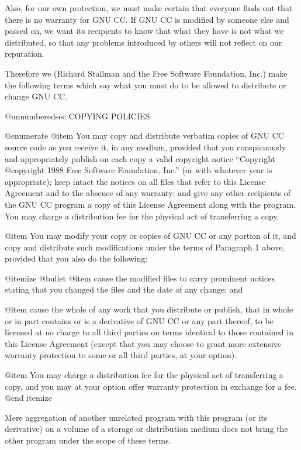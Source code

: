   Also, for our own protection, we must make certain that everyone
finds out that there is no warranty for GNU CC.  If GNU CC is modified by
someone else and passed on, we want its recipients to know that what
they have is not what we distributed, so that any problems introduced
by others will not reflect on our reputation.

  Therefore we (Richard Stallman and the Free Software Foundation,
Inc.) make the following terms which say what you must do to be
allowed to distribute or change GNU CC.

@unnumberedsec COPYING POLICIES

@enumerate
@item
You may copy and distribute verbatim copies of GNU CC source code as
you receive it, in any medium, provided that you conspicuously and
appropriately publish on each copy a valid copyright notice
``Copyright @copyright{} 1988 Free Software Foundation, Inc.'' (or
with whatever year is appropriate); keep intact the notices on all
files that refer to this License Agreement and to the absence of any
warranty; and give any other recipients of the GNU CC program a copy
of this License Agreement along with the program.  You may charge a
distribution fee for the physical act of transferring a copy.

@item
You may modify your copy or copies of GNU CC or any portion of it,
and copy and distribute such modifications under the terms of
Paragraph 1 above, provided that you also do the following:

@itemize @bullet
@item
cause the modified files to carry prominent notices stating
that you changed the files and the date of any change; and

@item
cause the whole of any work that you distribute or publish, that
in whole or in part contains or is a derivative of GNU CC or any
part thereof, to be licensed at no charge to all third parties on
terms identical to those contained in this License Agreement
(except that you may choose to grant more extensive warranty
protection to some or all third parties, at your option).

@item
You may charge a distribution fee for the physical act of
transferring a copy, and you may at your option offer warranty
protection in exchange for a fee.
@end itemize

Mere aggregation of another unrelated program with this program (or its
derivative) on a volume of a storage or distribution medium does not bring
the other program under the scope of these terms.

